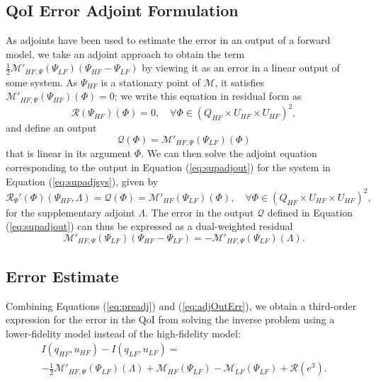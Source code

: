 \subsection{QoI Error Adjoint Formulation}

As adjoints have been used to estimate the error in an output of a forward model, we take an adjoint approach to obtain the term $\frac{1}{2}\mathcal{M}'_{HF,\Psi}(\Psi_{LF})(\Psi_{HF}-\Psi_{LF})$ by viewing it as an error in a linear output of some system. As $\Psi_{HF}$ is a stationary point of $\mathcal{M}$, it satisfies $\mathcal{M}'_{HF,\Psi}(\Psi_{HF})(\Phi)=0$; we write this equation in residual form as
\begin{equation}
\mathscr{R}(\Psi_{HF})(\Phi)=0,\quad\forall\Phi\in(Q_{HF}\times U_{HF}\times U_{HF})^2,
\label{eq:supadjsys}
\end{equation}
and define an output
\begin{equation}
\mathcal{Q}(\Phi)=\mathcal{M}'_{HF,\Psi}(\Psi_{LF})(\Phi)
\label{eq:supadjout}
\end{equation}
that is linear in its argument $\Phi$. We can then solve the adjoint equation corresponding to the output in Equation (\ref{eq:supadjout}) for the system in Equation (\ref{eq:supadjsys}), given by
\begin{equation}
\mathscr{R}_{\Psi}'(\Phi)(\Psi_{HF},\Lambda)=\mathcal{Q}(\Phi)=\mathcal M'_{HF}(\Psi_{LF})(\Phi),\quad\forall\Phi\in(Q_{HF}\times U_{HF}\times U_{HF})^2,
\label{eq:superAdjEq}
\end{equation}
for the supplementary adjoint $\Lambda$. The error in the output $\mathcal{Q}$ defined in Equation (\ref{eq:supadjout}) can thus be expressed as a dual-weighted residual
\begin{equation}
\mathcal M'_{HF,\Psi}(\Psi_{LF})(\Psi_{HF}-\Psi_{LF})=-\mathcal{M}'_{HF,\Psi}(\Psi_{LF})(\Lambda).
\label{eq:adjOutErr}
\end{equation}

\subsection{Error Estimate}

Combining Equations (\ref{eq:preadj}) and (\ref{eq:adjOutErr}), we obtain a third-order expression for the error in the QoI from solving the inverse problem using a lower-fidelity model instead of the high-fidelity model:
\begin{multline}
I(q_{HF},u_{HF})-I(q_{LF},u_{LF})=\\-\frac{1}{2}\mathcal{M}'_{HF,\Psi}(\Psi_{LF})(\Lambda)+\mathcal M_{HF}(\Psi_{LF})-\mathcal M_{LF}(\Psi_{LF})+\mathcal{R}(e^3).
\label{eq:finErrExp}
\end{multline}

